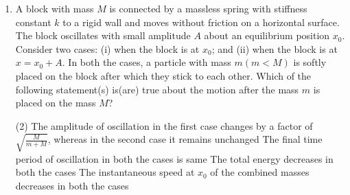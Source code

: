 
\begin{enumerate}
    \item A block with mass \(M\) is connected by a massless spring with stiffness constant \(k\) to a rigid wall and moves without friction on a horizontal surface. The block oscillates with small amplitude \(A\) about an equilibrium position \(x_0\). Consider two cases: (i) when the block is at \(x_0\); and (ii) when the block is at \(x = x_0 + A\). In both the cases, a particle with mass \(m (m < M)\) is softly placed on the block after which they stick to each other. Which of the following statement(s) is(are) true about the motion after the mass \(m\) is placed on the mass \(M\)?
        \begin{tasks}(2)
            \task The amplitude of oscillation in the first case changes by a factor of \(\sqrt{\frac{M}{m + M}}\), whereas in the second case it remains unchanged
            \task The final time period of oscillation in both the cases is same
            \task The total energy decreases in both the cases
            \task The instantaneous speed at \(x_0\) of the combined masses decreases in both the cases
        \end{tasks}
\end{enumerate}
